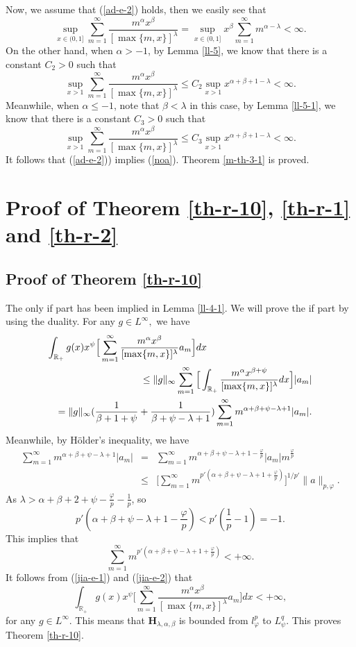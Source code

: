 \documentclass[10pt]{amsart}
\theoremstyle{definition}    %
\numberwithin{equation}{section}
\begin{document}
Now, we assume that (\ref{ad-e-2}) holds, then we easily see that 
$$\sup_{x\in (0,1]}\sum_{m=1}^{\infty}\frac{m^{\alpha}x^{\beta}}{[\max\{m,x\}]^{\lambda}}=\sup_{x\in (0,1]}x^{\beta}\sum_{m=1}^{\infty}m^{\alpha-\lambda}<\infty.$$
On the other hand, when $\alpha>-1$, by Lemma \ref{ll-5}, we know that there is a constant $C_2>0$ such that  
$$\sup_{x>1}\sum_{m=1}^{\infty}\frac{m^{\alpha}x^{\beta}}{[\max\{m,x\}]^{\lambda}}\leq C_2 \sup_{x>1}x^{\alpha+\beta+1-\lambda}<\infty.$$
Meanwhile, when $\alpha\leq -1$, note that $\beta<\lambda$ in this case, by Lemma \ref{ll-5-1}, we know that there is a constant $C_3>0$ such that  
$$\sup_{x>1}\sum_{m=1}^{\infty}\frac{m^{\alpha}x^{\beta}}{[\max\{m,x\}]^{\lambda}}\leq C_3 \sup_{x>1}x^{\alpha+\beta+1-\lambda}<\infty.$$
It follows that (\ref{ad-e-2})) implies (\ref{noa}). Theorem \ref{m-th-3-1} is proved.

\section{{\bf Proof of Theorem \ref{th-r-10}, \ref{th-r-1} and \ref{th-r-2}}}
\subsection{{\bf Proof of Theorem \ref{th-r-10}}}
The only if part has been implied in Lemma \ref{ll-4-1}. We will prove the if part by using the duality. For any $g\in L^{\infty},$
we have 
\begin{eqnarray}\label{jia-e-1} \lefteqn{\int_{\mathbb{R}_{+}}g(x)x^{\psi}\Big[\sum_{m=1}^{\infty}\frac{m^{\alpha}x^{\beta}}{[\max\{m, x\}]^{\lambda}}a_m\Big]dx} \nonumber \\
&& \leq \|g\|_{\infty} \sum_{m=1}^{\infty}\Big[\int_{\mathbb{R}_{+}}\frac{m^{\alpha}x^{\beta+\psi}}{[\max\{m, x\}]^{\lambda}}dx\Big]|a_m| \nonumber \\
&& =\|g\|_{\infty} (\frac{1}{\beta+1+\psi}+\frac{1}{\beta+\psi-\lambda+1}) \sum_{m=1}^{\infty} m^{\alpha+\beta+\psi-\lambda+1}|a_m|.
\end{eqnarray}
Meanwhile, by H\"older's inequality, we have 
\begin{eqnarray}\label{jia-e-2}
 \sum_{m=1}^{\infty} m^{\alpha+\beta+\psi-\lambda+1}|a_m|&=&\sum_{m=1}^{\infty} m^{\alpha+\beta+\psi-\lambda+1-\frac{\varphi}{p}}|a_m|m^{\frac{\varphi}{p}} \nonumber \\
 &\leq& \Big[\sum_{m=1}^{\infty} m^{p'(\alpha+\beta+\psi-\lambda+1+\frac{\varphi}{p})}\Big]^{1/p'} \|a\|_{p, \varphi}. 
\end{eqnarray}
As $\lambda>\alpha+\beta+2+\psi-\frac{\varphi}{p}-\frac{1}{p}$, so $$p'(\alpha+\beta+\psi-\lambda+1-\frac{\varphi}{p})<p'(\frac{1}{p}-1)=-1.$$
This implies that  $$\sum_{m=1}^{\infty} m^{p'(\alpha+\beta+\psi-\lambda+1+\frac{\varphi}{p})}<+\infty.$$
It follows from (\ref{jia-e-1}) and  (\ref{jia-e-2}) that $$\int_{\mathbb{R}_{+}}g(x)x^{\psi}\Big[\sum_{m=1}^{\infty}\frac{m^{\alpha}x^{\beta}}{[\max\{m, x\}]^{\lambda}}a_m\Big]dx<+\infty,$$
for any $g\in L^{\infty}$. This means that  $\mathbf{H}_{\lambda, \alpha, \beta}$ is bounded from
$l_{\varphi}^p$ to $L_{\psi}^q$. This proves Theorem \ref{th-r-10}.
\end{document}
